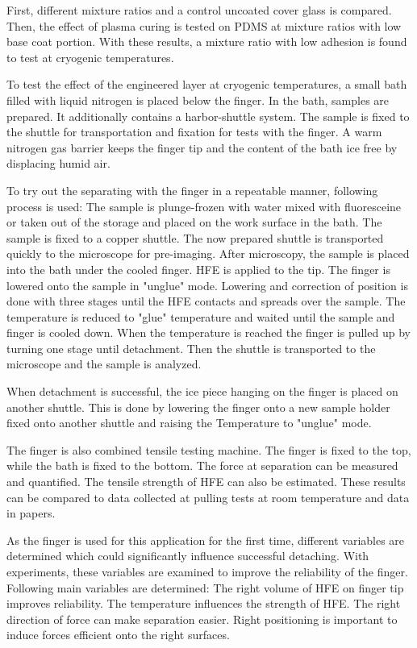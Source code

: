 First, different mixture ratios and  a control uncoated cover glass is compared. Then, the effect of plasma curing is tested on PDMS at mixture ratios with low base coat portion. With these results, a mixture ratio with low adhesion is found to test at cryogenic temperatures. 

To test the effect of the engineered layer at cryogenic temperatures, a small bath filled with liquid nitrogen is placed below the finger. In the bath, samples are prepared. It additionally contains a harbor-shuttle system. The sample is fixed to the shuttle for transportation and fixation for tests with the finger. A warm nitrogen gas barrier keeps the finger tip and the content of the bath ice free by displacing humid air.

To try out the separating with the finger in a repeatable manner, following process is used: The sample is plunge-frozen with water mixed with fluoresceine or taken out of the storage and placed on the work surface in the bath. The sample is fixed to a copper shuttle. The now prepared shuttle is transported quickly to the microscope for pre-imaging. After microscopy, the sample is placed into the bath under the cooled finger. HFE is applied to the tip. The finger is lowered onto the sample in "unglue" mode. Lowering and correction of position is done with three stages until the HFE contacts and spreads over the sample. The temperature is reduced to "glue" temperature and waited until the sample and finger is cooled down. When the temperature is reached the finger is pulled up by turning one stage until detachment. Then the shuttle is transported to the microscope and the sample is analyzed.

When detachment is successful, the ice piece hanging on the finger is placed on another shuttle. This is done by lowering the finger onto a new sample holder fixed onto another shuttle and raising the Temperature to "unglue" mode.

The finger is also combined tensile testing machine. The finger is fixed to the top, while the bath is fixed to the bottom. The force at separation can be measured and quantified. The tensile strength of HFE can also be estimated. These results can be compared to data collected at pulling tests at room temperature and data in papers.

As the finger is used for this application for the first time, different variables are determined which could significantly influence successful detaching. With experiments, these variables are examined to improve the reliability of the finger. Following main variables are determined: The right volume of HFE on finger tip improves reliability. The temperature influences the strength of HFE. The right direction of force can make separation easier. Right positioning is important to induce forces efficient onto the right surfaces.
